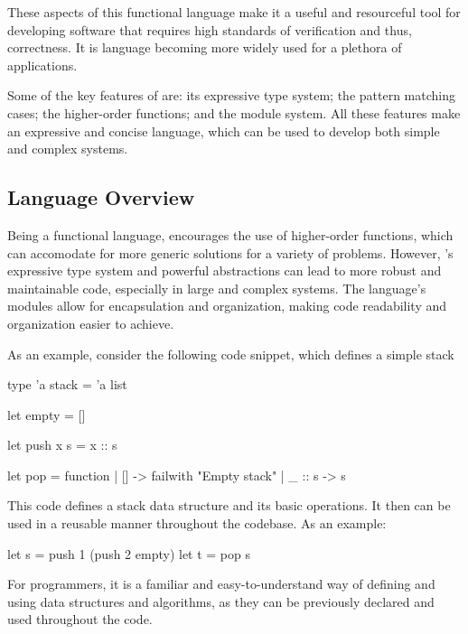 These aspects of this functional language make it a useful and resourceful tool 
for developing software that requires high standards of verification and thus, correctness.
It is language becoming more widely used for a plethora of applications.

Some of the key features of \ocaml are: its expressive type system; the pattern matching cases; 
the higher-order functions; and the module system. All these features make \ocaml an expressive 
and concise language, which can be used to develop both simple and complex systems.

\subsection{Language Overview} %
\label{sub:language_overview}

Being a functional language, \ocaml encourages the use of higher-order functions, 
which can accomodate for more generic solutions for a variety of problems. However,
\ocaml's expressive type system and powerful abstractions can lead to more robust
and maintainable code, especially in large and complex systems. The language's 
modules allow for encapsulation and organization, making code readability and organization 
easier to achieve.

As an example, consider the following code snippet, which defines a simple stack

\begin{ocamlenv}
    type 'a stack = 'a list

    let empty = []

    let push x s = x :: s

    let pop = function
        | [] -> failwith "Empty stack"
        | _ :: s -> s
\end{ocamlenv}

This code defines a stack data structure and its basic operations. It then can be used 
in a reusable manner throughout the codebase. As an example:

\begin{ocamlenv}
    let s = push 1 (push 2 empty)
    let t = pop s
\end{ocamlenv}


For programmers, it is a familiar and easy-to-understand way of defining and using 
data structures and algorithms, as they can be previously declared and used throughout 
the code.

